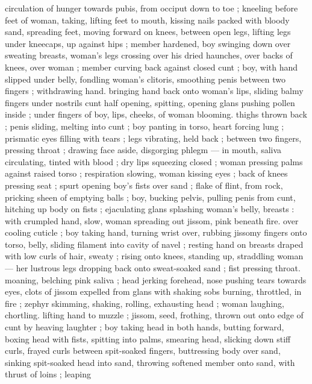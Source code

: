 circulation of hunger towards pubis, from occiput down to toe ; 
kneeling before feet of woman, taking, lifting feet to mouth, kissing 
nails packed with bloody sand, spreading feet, moving forward on 
knees, between open legs, lifting legs under kneecaps, up against 
hips ; member hardened, boy swinging down over sweating breasts, 
woman's legs crossing over his dried haunches, over backs of knees, 
 over woman ; member curving back against 
closed cunt ; boy, with hand slipped under belly, fondling woman's 
clitoris, smoothing penis between two fingers ; withdrawing hand. 
bringing hand back onto woman's lips, sliding balmy fingers under 
nostrils {\col} cunt half opening, spitting, opening {\col} glans pushing pollen 
inside ; under fingers of boy, lips, cheeks, of woman blooming. 
thighs thrown back ; penis sliding, melting into cunt ; boy panting {\col}
in torso, heart forcing lung ; prismatic eyes filling with tears ; legs 
vibrating,  held back ; between two fingers, pressing throat ;
drawing face aside, disgorging phlegm --- in mouth, saliva 
circulating, tinted with blood ; dry lips squeezing closed ; woman 
pressing palms against raised torso ; respiration slowing, woman 
kissing eyes ; back of knees pressing seat ; spurt opening boy's fists 
over sand ; flake of flint, from rock, pricking sheen of emptying balls 
; boy, bucking pelvis, pulling penis from cunt, hitching up body on 
fists ; ejaculating glans splashing woman's belly, breasts : with 
crumpled hand, slow, woman spreading out jissom, pink beneath fire. 
over cooling cuticle ; boy taking hand, turning wrist over, rubbing 
jissomy fingers onto torso, belly, sliding filament into cavity of navel 
; resting hand on breasts draped with low curls of hair, sweaty ; rising 
onto knees, standing up, straddling woman --- her lustrous legs 
dropping back onto sweat-soaked sand ; fist pressing throat. 
moaning, belching pink saliva ; head jerking{\comdash} forehead, nose 
pushing tears towards eyes, clots of jissom expelled from glans with 
shaking sobs {\dashcom} burning, throttled, in fire ; zephyr skimming, 
shaking, rolling, exhausting head ; woman laughing, chortling. lifting 
hand to muzzle ; jissom, seed, frothing, thrown out onto edge of cunt 
by heaving laughter ; boy taking head in both hands, butting forward, 
boxing head with fists, spitting into palms, smearing head, slicking 
down stiff curls, frayed curls between spit-soaked fingers, 
buttressing body over sand, sinking spit-soaked head into sand, 
throwing softened member onto sand, with thrust of loins ; leaping 
